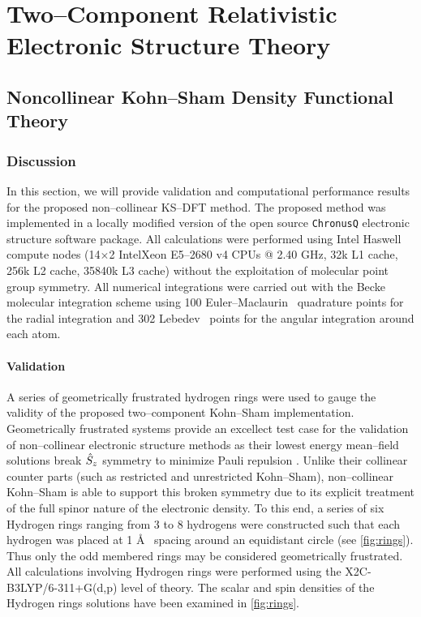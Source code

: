 \chapter{Two--Component Relativistic Electronic Structure Theory}

\section{Noncollinear Kohn--Sham Density Functional Theory}

\subsection{Discussion}

In this section, we will provide validation and computational performance
results for the proposed non--collinear KS--DFT method. The proposed method was
implemented in a locally modified version of the open source
\texttt{ChronusQ}\cite{chronusq_beta2} electronic structure software package.
All calculations were performed using Intel Haswell compute nodes (14$\times$2
Intel\textregistered Xeon E5--2680 v4 CPUs @ 2.40 GHz, 32k L1 cache, 256k L2
cache, 35840k L3 cache) without the exploitation of molecular point group
symmetry. All numerical integrations were carried out with the Becke molecular
integration scheme using 100 Euler--Maclaurin~\cite{Laming93_997} quadrature points for the
radial integration and 302 Lebedev~\cite{Lebedev77_99} points for the angular integration around
each atom.

\subsubsection{Validation}

A series of geometrically frustrated hydrogen rings were used to gauge the validity of the 
proposed two--component Kohn--Sham implementation. Geometrically frustrated systems
provide an excellect test case for the validation of non--collinear electronic structure
methods as their lowest energy mean--field solutions break $\hat{S}_z$ symmetry to minimize
Pauli repulsion \cite{Gross07_196405,Frisch07_125119,Frisch12_2193,Scuseria13_035117,Yamaguchi01_670,Blochl03_15772,Truhlar11_2629,Truhlar13_5349,Li15_154109} .
Unlike their collinear counter parts (such as restricted and unrestricted Kohn--Sham), non--collinear
Kohn--Sham is able to support this broken symmetry due to its explicit treatment of the full
spinor nature of the electronic density. To this end, a series of six Hydrogen rings ranging from 3 to
8 hydrogens were constructed such that each hydrogen was placed at 1 \AA~ spacing around 
an equidistant circle (see \cref{fig:rings}). Thus only the odd membered rings may be considered geometrically
frustrated. All calculations involving Hydrogen rings were performed using the X2C-B3LYP/6-311+G(d,p)
level of theory\cite{Becke93_5648,Parr88_785,Preuss89_200}. 
The scalar and spin densities of the Hydrogen rings solutions have been examined in \cref{fig:rings}. 


